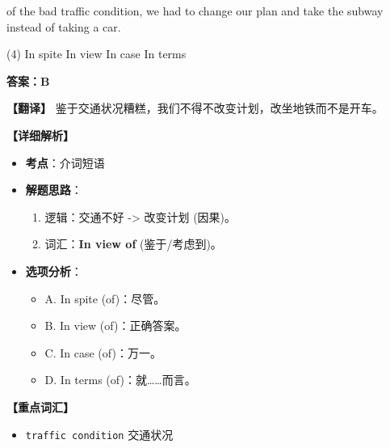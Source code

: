 \documentclass[11pt, a4paper]{article}
\newcommand{\analysis}[4]{
    \begin{solutionbox}
        \textbf{答案：#1}
        
        \textbf{【翻译】} #2
        
        \textbf{【详细解析】}
        #3
        
        \textbf{【重点词汇】}
        #4
    \end{solutionbox}
}
\newcommand{\blank}{\underline{\hspace{1.5cm}}}
\begin{document}
\begin{questions}
    \item \blank of the bad traffic condition, we had to change our plan and take the subway instead of taking a car.
    \begin{tasks}(4)
        \task In spite \task In view \task In case \task In terms
    \end{tasks}
    \analysis{B}{鉴于交通状况糟糕，我们不得不改变计划，改坐地铁而不是开车。}{
        \begin{itemize}
            \item \textbf{考点}：介词短语
            \item \textbf{解题思路}：
                \begin{enumerate}
                    \item 逻辑：交通不好 -> 改变计划 (因果)。
                    \item 词汇：\textbf{In view of} (鉴于/考虑到)。
                \end{enumerate}
            \item \textbf{选项分析}：
                \begin{itemize}
                    \item A. In spite (of)：尽管。
                    \item B. In view (of)：正确答案。
                    \item C. In case (of)：万一。
                    \item D. In terms (of)：就……而言。
                \end{itemize}
        \end{itemize}
    }{
        \begin{itemize}
            \item \texttt{traffic condition} 交通状况
        \end{itemize}
    }


\end{questions}
\end{document}
